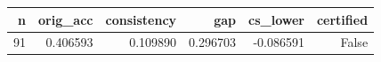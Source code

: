 \begin{tabular}{rrrrrr}
\toprule
n & orig_acc & consistency & gap & cs_lower & certified \\
\midrule
91 & 0.406593 & 0.109890 & 0.296703 & -0.086591 & False \\
\bottomrule
\end{tabular}
